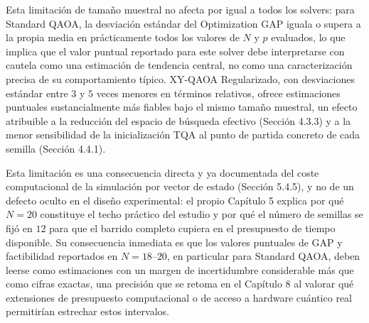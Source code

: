 Esta limitación de tamaño muestral no afecta por igual a todos los solvers: para Standard QAOA, la desviación estándar del Optimization GAP iguala o supera a la propia media en prácticamente todos los valores de $N$ y $p$ evaluados, lo que implica que el valor puntual reportado para este solver debe interpretarse con cautela como una estimación de tendencia central, no como una caracterización precisa de su comportamiento típico. XY-QAOA Regularizado, con desviaciones estándar entre $3$ y $5$ veces menores en términos relativos, ofrece estimaciones puntuales sustancialmente más fiables bajo el mismo tamaño muestral, un efecto atribuible a la reducción del espacio de búsqueda efectivo (Sección 4.3.3) y a la menor sensibilidad de la inicialización TQA al punto de partida concreto de cada semilla (Sección 4.4.1).

Esta limitación es una consecuencia directa y ya documentada del coste computacional de la simulación por vector de estado (Sección 5.4.5), y no de un defecto oculto en el diseño experimental: el propio Capítulo 5 explica por qué $N=20$ constituye el techo práctico del estudio y por qué el número de semillas se fijó en $12$ para que el barrido completo cupiera en el presupuesto de tiempo disponible. Su consecuencia inmediata es que los valores puntuales de GAP y factibilidad reportados en $N=18$--$20$, en particular para Standard QAOA, deben leerse como estimaciones con un margen de incertidumbre considerable más que como cifras exactas, una precisión que se retoma en el Capítulo 8 al valorar qué extensiones de presupuesto computacional o de acceso a hardware cuántico real permitirían estrechar estos intervalos.